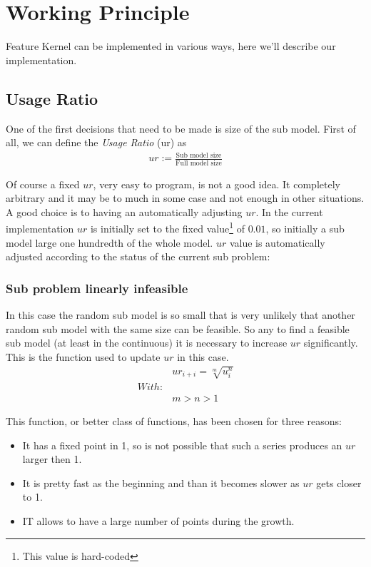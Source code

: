 \section{Working Principle}

Feature Kernel can be implemented in various ways, here we'll describe our implementation. 

\subsection{Usage Ratio}
One of the first decisions that need to be made is size of the sub model.
First of all, we can define the \emph{Usage Ratio} (ur) as 
\begin{align}
    ur := \frac{\text{Sub model size}}{\text{Full model size}} \label{eq:usage-ratio}
\end{align}

Of course a fixed $ur$, very easy to program, is not a good idea. 
It completely arbitrary and it may be to much in some case and not enough in other situations. 
A good choice is to having an automatically adjusting $ur$. In the current implementation $ur$ is initially set to the fixed value\footnote{This value is hard-coded} of $0.01$, so initially
a sub model large one hundredth of the whole model. $ur$ value is automatically adjusted according to the status of the current sub problem:


\subsubsection*{Sub problem linearly infeasible} 

    In this case the random sub model is so small that is very unlikely that another random sub model
    with the same size can be feasible. So any to find a feasible sub model (at least in the continuous) 
    it is necessary to increase $ur$ significantly. This is the function used to update $ur$ in this case. 
    \begin{align}
        &ur_{i+i} = \sqrt[m]{u_{i}^{n}}\label{eq:ur-infease-grow} \\
        With:&\nonumber \\
        &m > n > 1 \nonumber
    \end{align}

    This function, or better class of functions, has been chosen for three reasons:
    \begin{itemize}
        \item It has a fixed point in 1, so is not possible that such a series produces an $ur$ larger then 1.
        \item It is pretty fast as the beginning and than it becomes slower as $ur$ gets closer to 1.
        \item IT allows to have a large number of points during the growth.
    \end{itemize}


